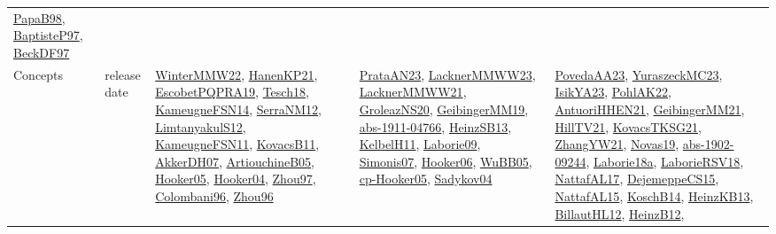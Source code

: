 {\begin{longtable}{llp{6cm}p{6cm}p{6cm}}
\href{articles/PapaB98.pdf}{PapaB98}\cite{PapaB98}, \href{papers/BaptisteP97.pdf}{BaptisteP97}\cite{BaptisteP97}, \href{papers/BeckDF97.pdf}{BeckDF97}\cite{BeckDF97}\\
Concepts & release date & \href{papers/WinterMMW22.pdf}{WinterMMW22}\cite{WinterMMW22}, \href{papers/HanenKP21.pdf}{HanenKP21}\cite{HanenKP21}, \href{articles/EscobetPQPRA19.pdf}{EscobetPQPRA19}\cite{EscobetPQPRA19}, \href{papers/Tesch18.pdf}{Tesch18}\cite{Tesch18}, \href{articles/KameugneFSN14.pdf}{KameugneFSN14}\cite{KameugneFSN14}, \href{papers/SerraNM12.pdf}{SerraNM12}\cite{SerraNM12}, \href{articles/LimtanyakulS12.pdf}{LimtanyakulS12}\cite{LimtanyakulS12}, \href{papers/KameugneFSN11.pdf}{KameugneFSN11}\cite{KameugneFSN11}, \href{articles/KovacsB11.pdf}{KovacsB11}\cite{KovacsB11}, \href{papers/AkkerDH07.pdf}{AkkerDH07}\cite{AkkerDH07}, \href{papers/ArtiouchineB05.pdf}{ArtiouchineB05}\cite{ArtiouchineB05}, \href{articles/Hooker05.pdf}{Hooker05}\cite{Hooker05}, \href{papers/Hooker04.pdf}{Hooker04}\cite{Hooker04}, \href{articles/Zhou97.pdf}{Zhou97}\cite{Zhou97}, \href{papers/Colombani96.pdf}{Colombani96}\cite{Colombani96}, \href{papers/Zhou96.pdf}{Zhou96}\cite{Zhou96} & \href{articles/PrataAN23.pdf}{PrataAN23}\cite{PrataAN23}, \href{articles/LacknerMMWW23.pdf}{LacknerMMWW23}\cite{LacknerMMWW23}, \href{papers/LacknerMMWW21.pdf}{LacknerMMWW21}\cite{LacknerMMWW21}, \href{papers/GroleazNS20.pdf}{GroleazNS20}\cite{GroleazNS20}, \href{papers/GeibingerMM19.pdf}{GeibingerMM19}\cite{GeibingerMM19}, \href{articles/abs-1911-04766.pdf}{abs-1911-04766}\cite{abs-1911-04766}, \href{articles/HeinzSB13.pdf}{HeinzSB13}\cite{HeinzSB13}, \href{articles/KelbelH11.pdf}{KelbelH11}\cite{KelbelH11}, \href{papers/Laborie09.pdf}{Laborie09}\cite{Laborie09}, \href{articles/Simonis07.pdf}{Simonis07}\cite{Simonis07}, \href{articles/Hooker06.pdf}{Hooker06}\cite{Hooker06}, \href{papers/WuBB05.pdf}{WuBB05}\cite{WuBB05}, \href{papers/cp-Hooker05.pdf}{cp-Hooker05}\cite{cp-Hooker05}, \href{papers/Sadykov04.pdf}{Sadykov04}\cite{Sadykov04} & \href{papers/PovedaAA23.pdf}{PovedaAA23}\cite{PovedaAA23}, \href{papers/YuraszeckMC23.pdf}{YuraszeckMC23}\cite{YuraszeckMC23}, \href{articles/IsikYA23.pdf}{IsikYA23}\cite{IsikYA23}, \href{articles/PohlAK22.pdf}{PohlAK22}\cite{PohlAK22}, \href{papers/AntuoriHHEN21.pdf}{AntuoriHHEN21}\cite{AntuoriHHEN21}, \href{papers/GeibingerMM21.pdf}{GeibingerMM21}\cite{GeibingerMM21}, \href{papers/HillTV21.pdf}{HillTV21}\cite{HillTV21}, \href{papers/KovacsTKSG21.pdf}{KovacsTKSG21}\cite{KovacsTKSG21}, \href{articles/ZhangYW21.pdf}{ZhangYW21}\cite{ZhangYW21}, \href{articles/Novas19.pdf}{Novas19}\cite{Novas19}, \href{articles/abs-1902-09244.pdf}{abs-1902-09244}\cite{abs-1902-09244}, \href{papers/Laborie18a.pdf}{Laborie18a}\cite{Laborie18a}, \href{articles/LaborieRSV18.pdf}{LaborieRSV18}\cite{LaborieRSV18}, \href{articles/NattafAL17.pdf}{NattafAL17}\cite{NattafAL17}, \href{papers/DejemeppeCS15.pdf}{DejemeppeCS15}\cite{DejemeppeCS15}, \href{articles/NattafAL15.pdf}{NattafAL15}\cite{NattafAL15}, \href{papers/KoschB14.pdf}{KoschB14}\cite{KoschB14}, \href{papers/HeinzKB13.pdf}{HeinzKB13}\cite{HeinzKB13}, \href{papers/BillautHL12.pdf}{BillautHL12}\cite{BillautHL12}, \href{papers/HeinzB12.pdf}{HeinzB12}\cite{HeinzB12}, 
\end{longtable}}
